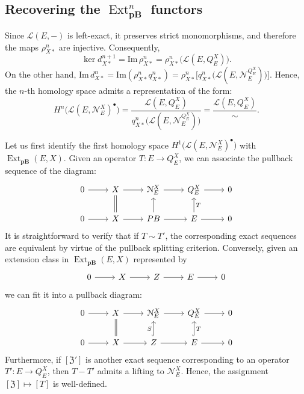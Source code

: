 \documentclass[12pt,a4paper]{amsproc}
\theoremstyle{remark}
\theoremstyle{definition}
\newcommand{\Ext}{\operatorname{Ext}}
\newcommand{\pBan}{\operatorname{\textbf{pB}}}
\numberwithin{equation}{section}
\begin{document}
\subsection{Recovering the $\Ext^n_{\boldsymbol{\pBan}}$ functors}

Since $\mathcal{L}(E,-)$ is left-exact, it preserves strict monomorphisms, and therefore the maps $\rho_{X*}^n$ are injective. Consequently,
\[
	\ker d_{X*}^{n+1} = \mathrm{Im}\, \rho_{X*}^n = \rho_{X*}^n\big(\mathcal{L}(E,Q_E^X)\big).
\]
On the other hand, $\mathrm{Im}\, d_{X*}^n = \mathrm{Im}(\rho_{X*}^n q_{X*}^n) = \rho_{X*}^n \big[q_{X*}^n\big(\mathcal{L}(E,\mathcal{N}_E^{Q_E^X})\big)\big]$. Hence, the $n$-th homology space admits a representation of the form:
\[
	H^n\big(\mathcal{L}(E, \mathcal{N}_E^X)^{\bullet}\big) = \frac{\mathcal{L}(E,Q_E^X)}{q_{X*}^n\big(\mathcal{L}(E,\mathcal{N}_E^{Q_E^X})\big)} = \frac{\mathcal{L}(E,Q_E^X)}{\sim}.
\]

Let us first identify the first homology space $H^1\big(\mathcal{L}(E, \mathcal{N}_E^X)^{\bullet}\big)$ with $\Ext_{\boldsymbol{\pBan}}(E,X)$. Given an operator $T: E \to Q_E^X$, we can associate the pullback sequence of the diagram:
\[
\begin{tikzcd}
	0 \arrow[r] & X \arrow[r] & \mathcal{N}_E^X \arrow[r] & Q_E^X \arrow[r] & 0 \\
	0 \arrow[r] & X \arrow[u, equal] \arrow[r] & PB \arrow[u] \arrow[r] & E \arrow[u, "T"'] \arrow[r] & 0
\end{tikzcd}
\]
It is straightforward to verify that if $T \sim T'$, the corresponding exact sequences are equivalent by virtue of the pullback splitting criterion. Conversely, given an extension class in $\Ext_{\boldsymbol{\pBan}}(E,X)$ represented by
\[
\begin{tikzcd}
	0 \arrow[r] & X \arrow[r] & Z \arrow[r] & E \arrow[r] & 0
\end{tikzcd}
\]
we can fit it into a pullback diagram:
\[
\begin{tikzcd}
	0 \arrow[r] & X \arrow[r] & \mathcal{N}_E^X \arrow[r] & Q_E^X \arrow[r] & 0 \\
	0 \arrow[r] & X \arrow[u, equal] \arrow[r] & Z \arrow[u, hook, "S"] \arrow[r] & E \arrow[u, hook, "T"'] \arrow[r] & 0
\end{tikzcd}
\]
Furthermore, if $[\mathfrak{Z}']$ is another exact sequence corresponding to an operator $T': E \to Q_E^X$, then $T - T'$ admits a lifting to $\mathcal{N}_E^X$. Hence, the assignment $[\mathfrak{Z}] \mapsto [T]$ is well-defined.
\end{document}
